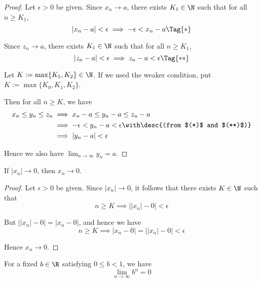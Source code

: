 \begin{proof}
  Let $\epsilon>0$ be given. Since $x_n\to a$, there exists $K_1\in\N$ such that
  for all $n\geq K_1$,
  \begin{equation*}
    |x_n-a|<\epsilon \implies-\epsilon<x_n-a\Tag{*}
  \end{equation*}

  Since $z_n\to a$, there exists $K_1\in\N$ such that for all $n\geq K_1$,
  \begin{equation*}
    |z_n-a|<\epsilon \implies z_n-a<\epsilon\Tag{**}
  \end{equation*}

  Let $K:=\max\{K_1,K_2\}\in\N$. If we used the weaker condition, put
  $K:=\max\{K_0,K_1,K_2\}$.

  Then for all $n\geq K$, we have
  \begin{align*}
    x_n\leq y_n\leq z_n
     &\implies x_n-a\leq y_n-a\leq z_n-a                                   \\
     &\implies -\epsilon<y_n-a<\epsilon\with\desc{(from $(*)$ and $(**)$)} \\
     &\implies |y_n-a|<\epsilon
  \end{align*}

  Hence we also have $\displaystyle\lim_{n\to\infty}y_n=a$.
\end{proof}

\label{a9a7a2f}

If $|x_n|\to0$, then $x_n\to0$.

\begin{proof}
  Let $\epsilon>0$ be given. Since $|x_n|\to0$, it follows that there exists
  $K\in\N$ such that
  $$
    n\geq K\implies \big||x_n|-0\big|<\epsilon
  $$

  But $\big||x_n|-0\big|=|x_n-0|$, and hence we have
  $$
    n\geq K\implies |x_n-0|=\big||x_n|-0\big|<\epsilon
  $$

  Hence $x_n\to0$.
\end{proof}

\label{b88d621}

For a fixed $b\in\R$ satisfying $0\leq b<1$, we have
$$
  \lim_{n\to\infty}b^n=0
$$

